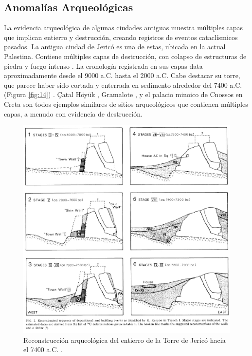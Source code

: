 \documentclass[10pt,twocolumn,letterpaper]{article}
\begin{document}
\subsection{Anomalías Arqueológicas}

La evidencia arqueológica de algunas ciudades antiguas muestra múltiples capas que implican entierro y destrucción, creando registros de eventos cataclísmicos pasados. La antigua ciudad de Jericó es una de estas, ubicada en la actual Palestina. Contiene múltiples capas de destrucción, con colapso de estructuras de piedra y fuego intenso \cite{96,97}. La cronología registrada en sus capas data aproximadamente desde el 9000 a.C. hasta el 2000 a.C. Cabe destacar su torre, que parece haber sido cortada y enterrada en sedimento alrededor del 7400 a.C. (Figura \ref{fig:14}) \cite{95}. Çatal Höyük \cite{99}, Gramalote \cite{98}, y el palacio minoico de Cnossos en Creta \cite{100,101} son todos ejemplos similares de sitios arqueológicos que contienen múltiples capas, a menudo con evidencia de destrucción.

\begin{figure}[b]
\begin{center}
   \includegraphics[width=1\linewidth]{jericho.jpg}
\end{center}
   \caption{Reconstrucción arqueológica del entierro de la Torre de Jericó hacia el 7400 a.C. \cite{95}.}
\label{fig:14}
\label{fig:onecol}
\end{figure}
\end{document}
